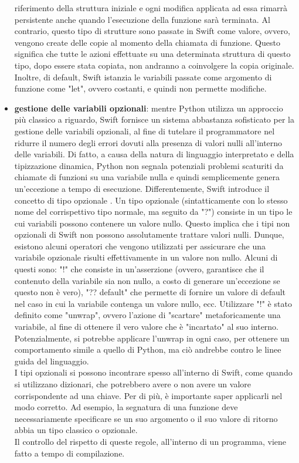 \begin{itemize}
    riferimento della struttura iniziale e ogni modifica applicata ad
    essa rimarrà persistente anche quando l'esecuzione della funzione sarà 
   	terminata. Al contrario, questo tipo di strutture sono passate in 
   	Swift come valore, ovvero, vengono create delle copie al momento della
   	chiamata di funzione. Questo significa che tutte le azioni effettuate
    su una determinata struttura di questo tipo, dopo essere stata copiata, 
    non andranno a coinvolgere la copia originale. Inoltre, di default, Swift
    istanzia le variabili passate come argomento di funzione come "let",
    ovvero costanti, e quindi non permette modifiche.
    \item \textbf{gestione delle variabili opzionali}: mentre Python utilizza un
    approccio più classico a riguardo, Swift fornisce un sistema
    abbastanza sofisticato per la gestione delle variabili opzionali,
    al fine di tutelare il programmatore nel ridurre il numero degli errori
    dovuti alla presenza di valori nulli all'interno delle variabili.
    Di fatto, a causa della natura di linguaggio interpretato e della
    tipizzazione dinamica, Python non segnala potenziali problemi scaturiti
    da chiamate di funzioni su una variabile nulla e quindi semplicemente 
    genera un'eccezione a tempo di esecuzione. Differentemente, Swift
    introduce il concetto di tipo opzionale \cite{empirical_study_usage_swift}. 
    Un tipo opzionale (sintatticamente
    con lo stesso nome del corrispettivo tipo normale, ma seguito da "?") consiste 
    in un tipo le cui variabili possono contenere un valore nullo. Questo implica
    che i tipi non opzionali di Swift non possono assolutamente trattare 
    valori nulli. Dunque, esistono alcuni operatori che vengono utilizzati
    per assicurare che una variabile opzionale risulti effettivamente in un 
    valore non nullo. Alcuni di questi sono: "!" che consiste in un'asserzione
    (ovvero, garantisce che il contenuto della variabile sia non nullo, a costo 
    di generare un'eccezione se questo non è vero), "?? default" che permette
    di fornire un valore di default nel caso in cui la variabile contenga un 
    valore nullo, ecc. Utilizzare "!" è stato definito come "unwrap", ovvero
    l'azione di "scartare" metaforicamente una variabile, al fine di ottenere
    il vero valore che è "incartato" al suo interno. Potenzialmente, si 
    potrebbe applicare l'unwrap in ogni caso, per ottenere un comportamento 
    simile a quello di Python, ma ciò andrebbe contro le linee guida del
    linguaggio. \\
    I tipi opzionali si possono incontrare spesso all'interno di Swift, come 
    quando si utilizzano dizionari, che potrebbero avere o non avere un valore
    corrispondente ad una chiave. Per di più, è importante saper applicarli
    nel modo corretto. Ad esempio, la segnatura di una funzione deve 
    necessariamente specificare se un suo argomento o il suo valore di 
    ritorno abbia un tipo classico o opzionale.\\
    Il controllo del rispetto di queste regole, all'interno di un programma,
    viene fatto a tempo di compilazione.
    
\end{itemize}

